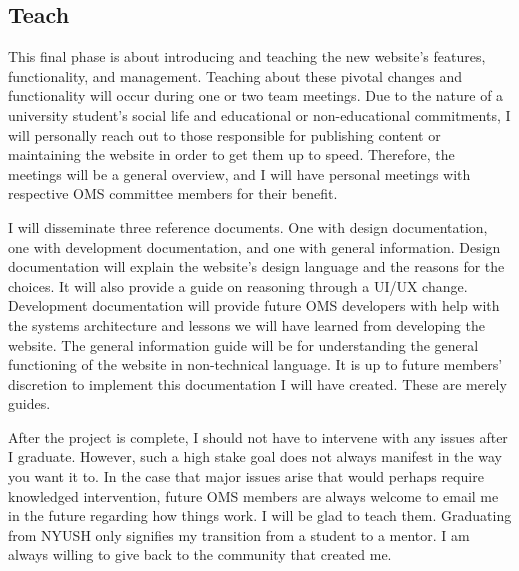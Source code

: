 \subsection{Teach}
This final phase is about introducing and teaching the new website's features, functionality, and management. Teaching about these pivotal changes and functionality will occur during one or two team meetings. Due to the nature of a university student's social life and educational or non-educational commitments, I will personally reach out to those responsible for publishing content or maintaining the website in order to get them up to speed. Therefore, the meetings will be a general overview, and I will have personal meetings with respective OMS committee members for their benefit.

I will disseminate three reference documents. One with design documentation, one with development documentation, and one with general information. Design documentation will explain the website's design language and the reasons for the choices. It will also provide a guide on reasoning through a UI/UX change. Development documentation will provide future OMS developers with help with the systems architecture and lessons we will have learned from developing the website. The general information guide will be for understanding the general functioning of the website in non-technical language. It is up to future members' discretion to implement this documentation I will have created. These are merely guides.

After the project is complete, I should not have to intervene with any issues after I graduate. However, such a high stake goal does not always manifest in the way you want it to. In the case that major issues arise that would perhaps require knowledged intervention, future OMS members are always welcome to email me in the future regarding how things work. I will be glad to teach them. Graduating from NYUSH only signifies my transition from a student to a mentor. I am always willing to give back to the community that created me.
